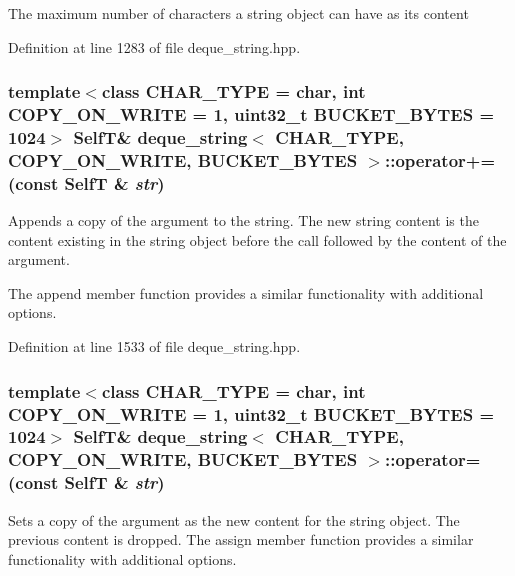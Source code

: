 The maximum number of characters a string object can have as its content 

Definition at line 1283 of file deque\_\-string.hpp.\hypertarget{classdeque__string_be047cca197538745a78f73347fbdfb1}{
\subsubsection[{operator+=}]{\setlength{\rightskip}{0pt plus 5cm}template$<$class CHAR\_\-TYPE  = char, int COPY\_\-ON\_\-WRITE = 1, uint32\_\-t BUCKET\_\-BYTES = 1024$>$ {\bf SelfT}\& {\bf deque\_\-string}$<$ CHAR\_\-TYPE, COPY\_\-ON\_\-WRITE, BUCKET\_\-BYTES $>$::operator+= (const {\bf SelfT} \& {\em str})}}
\label{classdeque__string_be047cca197538745a78f73347fbdfb1}


Appends a copy of the argument to the string. The new string content is the content existing in the string object before the call followed by the content of the argument.

The append member function provides a similar functionality with additional options. 

Definition at line 1533 of file deque\_\-string.hpp.\hypertarget{classdeque__string_dc6562d086b15033ba12303fbe9bc634}{
\subsubsection[{operator=}]{\setlength{\rightskip}{0pt plus 5cm}template$<$class CHAR\_\-TYPE  = char, int COPY\_\-ON\_\-WRITE = 1, uint32\_\-t BUCKET\_\-BYTES = 1024$>$ {\bf SelfT}\& {\bf deque\_\-string}$<$ CHAR\_\-TYPE, COPY\_\-ON\_\-WRITE, BUCKET\_\-BYTES $>$::operator= (const {\bf SelfT} \& {\em str})}}
\label{classdeque__string_dc6562d086b15033ba12303fbe9bc634}


Sets a copy of the argument as the new content for the string object. The previous content is dropped. The assign member function provides a similar functionality with additional options. 

